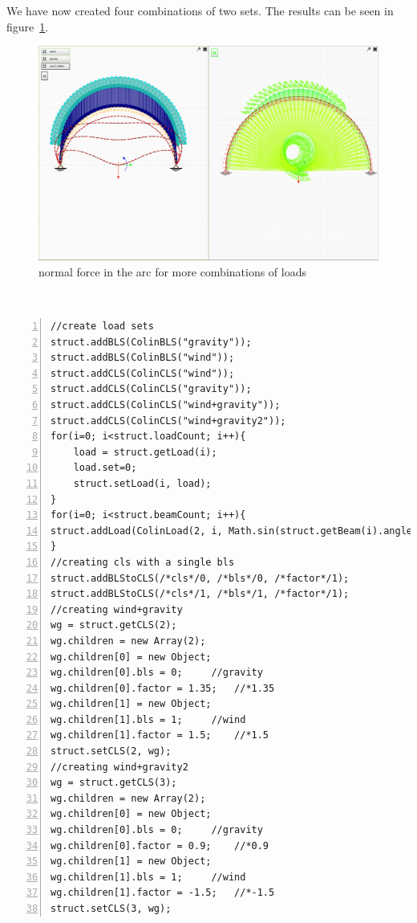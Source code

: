 We have now created four combinations of two sets. The results can be seen in figure~\ref{pic:scriptclsfinished}.
\begin{figure}[H]
\begin{center}
\includegraphics[width=\textwidth]{../pictures/scriptclsfinished.png}
\caption{normal force in the arc for more combinations of loads}
\label{pic:scriptclsfinished}
\end{center}
\end{figure}
\vspace{20pt}\\


\begin{lstlisting}[frame=single, basicstyle=\small, label=lst:setcreation, caption=creating load sets, numbers=left, firstnumber=1, tabsize=3]
//create load sets
struct.addBLS(ColinBLS("gravity"));
struct.addBLS(ColinBLS("wind"));
struct.addCLS(ColinCLS("wind"));
struct.addCLS(ColinCLS("gravity"));
struct.addCLS(ColinCLS("wind+gravity"));
struct.addCLS(ColinCLS("wind+gravity2"));
for(i=0; i<struct.loadCount; i++){
	load = struct.getLoad(i);
	load.set=0;
	struct.setLoad(i, load);
}
for(i=0; i<struct.beamCount; i++){
struct.addLoad(ColinLoad(2, i, Math.sin(struct.getBeam(i).angle)*500, -Math.cos(struct.getBeam(i).angle)*500, 0, 1));
}
//creating cls with a single bls
struct.addBLStoCLS(/*cls*/0, /*bls*/0, /*factor*/1);
struct.addBLStoCLS(/*cls*/1, /*bls*/1, /*factor*/1);
//creating wind+gravity
wg = struct.getCLS(2);
wg.children = new Array(2);
wg.children[0] = new Object;
wg.children[0].bls = 0;		//gravity
wg.children[0].factor = 1.35;	//*1.35
wg.children[1] = new Object;
wg.children[1].bls = 1;		//wind
wg.children[1].factor = 1.5;	//*1.5
struct.setCLS(2, wg);
//creating wind+gravity2
wg = struct.getCLS(3);
wg.children = new Array(2);
wg.children[0] = new Object;
wg.children[0].bls = 0;		//gravity
wg.children[0].factor = 0.9;	//*0.9
wg.children[1] = new Object;
wg.children[1].bls = 1;		//wind
wg.children[1].factor = -1.5;	//*-1.5
struct.setCLS(3, wg);
\end{lstlisting}
